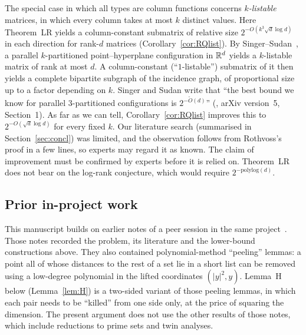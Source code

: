 \begin{remark}\label{rem:SS}
The special case in which all types are column functions concerns \emph{$k$-listable} matrices, in which every
column takes at most $k$ distinct values. Here Theorem~LR yields a column-constant submatrix of relative size
$2^{-O(k^3\sqrt d\log d)}$ in each direction for rank-$d$ matrices (Corollary~\ref{cor:RQlist}). By
Singer--Sudan~\cite[Prop.~2.3]{SingerSudan}, a parallel $k$-partitioned point--hyperplane configuration in $\mathbb{R}^d$
yields a $k$-listable matrix of rank at most $d$. A column-constant (``$1$-listable'') submatrix of it then yields a
complete bipartite subgraph of the incidence graph, of proportional size up to a factor depending on $k$. Singer and
Sudan write that ``the best bound we know for parallel 3-partitioned configurations is $2^{-\tilde O(d)}$''
(\cite{SingerSudan}, arXiv version~5, Section~1). As far as we can tell, Corollary~\ref{cor:RQlist} improves this to
$2^{-O(\sqrt d\log d)}$ for every fixed $k$. Our literature search (summarised in Section~\ref{sec:concl}) was
limited, and the observation follows from Rothvoss's proof in a few lines, so experts may regard it as known. The
claim of improvement must be confirmed by experts before it is relied on. Theorem~LR does not bear on the
log-rank conjecture, which would require $2^{-\mathrm{polylog}(d)}$.
\end{remark}

\subsection{Prior in-project work}
This manuscript builds on earlier notes of a peer session in the same project~\cite{Peer}. Those notes
recorded the problem, its literature and the lower-bound constructions above. They also contained
polynomial-method ``peeling'' lemmas: a point all of whose distances to the rest of a set lie in a short list can
be removed using a low-degree polynomial in the lifted coordinates $(|y|^2,y)$. Lemma~H below
(Lemma~\ref{lem:H}) is a two-sided variant of those peeling lemmas, in which each pair needs to be ``killed'' from
one side only, at the price of squaring the dimension. The present argument does not use the other results of
those notes, which include reductions to prime sets and twin analyses.

